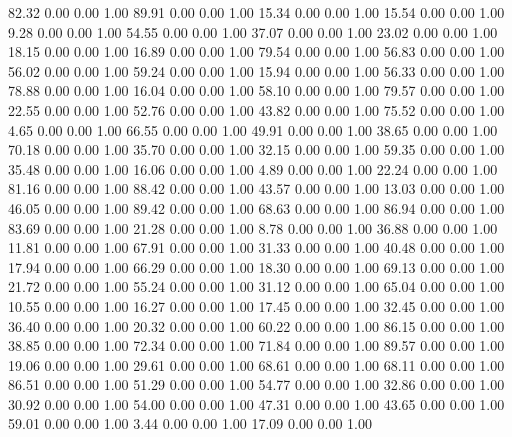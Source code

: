    82.32   0.00   0.00   1.00
   89.91   0.00   0.00   1.00
   15.34   0.00   0.00   1.00
   15.54   0.00   0.00   1.00
    9.28   0.00   0.00   1.00
   54.55   0.00   0.00   1.00
   37.07   0.00   0.00   1.00
   23.02   0.00   0.00   1.00
   18.15   0.00   0.00   1.00
   16.89   0.00   0.00   1.00
   79.54   0.00   0.00   1.00
   56.83   0.00   0.00   1.00
   56.02   0.00   0.00   1.00
   59.24   0.00   0.00   1.00
   15.94   0.00   0.00   1.00
   56.33   0.00   0.00   1.00
   78.88   0.00   0.00   1.00
   16.04   0.00   0.00   1.00
   58.10   0.00   0.00   1.00
   79.57   0.00   0.00   1.00
   22.55   0.00   0.00   1.00
   52.76   0.00   0.00   1.00
   43.82   0.00   0.00   1.00
   75.52   0.00   0.00   1.00
    4.65   0.00   0.00   1.00
   66.55   0.00   0.00   1.00
   49.91   0.00   0.00   1.00
   38.65   0.00   0.00   1.00
   70.18   0.00   0.00   1.00
   35.70   0.00   0.00   1.00
   32.15   0.00   0.00   1.00
   59.35   0.00   0.00   1.00
   35.48   0.00   0.00   1.00
   16.06   0.00   0.00   1.00
    4.89   0.00   0.00   1.00
   22.24   0.00   0.00   1.00
   81.16   0.00   0.00   1.00
   88.42   0.00   0.00   1.00
   43.57   0.00   0.00   1.00
   13.03   0.00   0.00   1.00
   46.05   0.00   0.00   1.00
   89.42   0.00   0.00   1.00
   68.63   0.00   0.00   1.00
   86.94   0.00   0.00   1.00
   83.69   0.00   0.00   1.00
   21.28   0.00   0.00   1.00
    8.78   0.00   0.00   1.00
   36.88   0.00   0.00   1.00
   11.81   0.00   0.00   1.00
   67.91   0.00   0.00   1.00
   31.33   0.00   0.00   1.00
   40.48   0.00   0.00   1.00
   17.94   0.00   0.00   1.00
   66.29   0.00   0.00   1.00
   18.30   0.00   0.00   1.00
   69.13   0.00   0.00   1.00
   21.72   0.00   0.00   1.00
   55.24   0.00   0.00   1.00
   31.12   0.00   0.00   1.00
   65.04   0.00   0.00   1.00
   10.55   0.00   0.00   1.00
   16.27   0.00   0.00   1.00
   17.45   0.00   0.00   1.00
   32.45   0.00   0.00   1.00
   36.40   0.00   0.00   1.00
   20.32   0.00   0.00   1.00
   60.22   0.00   0.00   1.00
   86.15   0.00   0.00   1.00
   38.85   0.00   0.00   1.00
   72.34   0.00   0.00   1.00
   71.84   0.00   0.00   1.00
   89.57   0.00   0.00   1.00
   19.06   0.00   0.00   1.00
   29.61   0.00   0.00   1.00
   68.61   0.00   0.00   1.00
   68.11   0.00   0.00   1.00
   86.51   0.00   0.00   1.00
   51.29   0.00   0.00   1.00
   54.77   0.00   0.00   1.00
   32.86   0.00   0.00   1.00
   30.92   0.00   0.00   1.00
   54.00   0.00   0.00   1.00
   47.31   0.00   0.00   1.00
   43.65   0.00   0.00   1.00
   59.01   0.00   0.00   1.00
    3.44   0.00   0.00   1.00
   17.09   0.00   0.00   1.00
